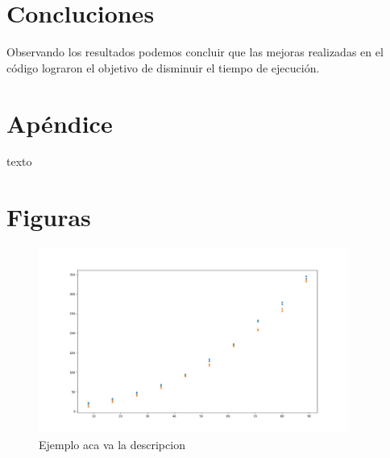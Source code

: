 \documentclass{article}
\begin{document}
\section{Concluciones}
Observando los resultados podemos concluir que las mejoras realizadas en el código lograron el objetivo de disminuir el tiempo de ejecución.

\section{Apéndice}
texto

\clearpage
\section{Figuras}
\begin{figure}[h]
\begin{center}
\includegraphics[width=4in]{./images/inputVsOutput.jpeg}
\caption{Ejemplo aca va la descripcion }
\label{grafico}
\end{center}
\end{figure}
\clearpage
\end{document}

